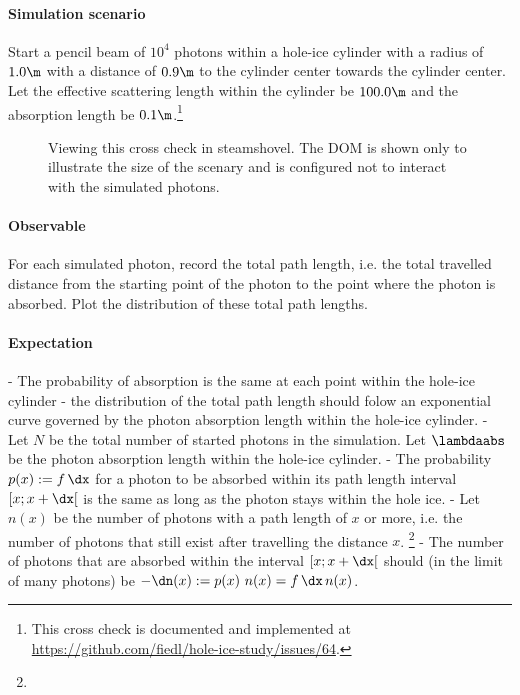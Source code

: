 \paragraph{Simulation scenario} Start a pencil beam of $10^4$ photons within a hole-ice cylinder with a radius of $1.0\m$ with a distance of $0.9\m$ to the cylinder center towards the cylinder center. Let the effective scattering length within the cylinder be $100.0\m$ and the absorption length be $0.1\m$.\footnote{This cross check is documented and implemented at \url{https://github.com/fiedl/hole-ice-study/issues/64}.}



\begin{figure}
  \caption{Viewing this cross check in steamshovel. The DOM is shown only to illustrate the size of the scenary and is configured not to interact with the simulated photons.}
\end{figure}

\paragraph{Observable} For each simulated photon, record the total path length, i.e. the total travelled distance from the starting point of the photon to the point where the photon is absorbed. Plot the distribution of these total path lengths.

\paragraph{Expectation}

- The probability of absorption is the same at each point within the hole-ice cylinder
- the distribution of the total path length should folow an exponential curve governed by the photon absorption length within the hole-ice cylinder.
- Let $N$ be the total number of started photons in the simulation. Let $\lambdaabs$ be the photon absorption length within the hole-ice cylinder.
- The probability $p(x):=f\,\dx$ for a photon to be absorbed within its path length interval $[x; x + \dx[$ is the same as long as the photon stays within the hole ice.
- Let $n(x)$ be the number of photons with a path length of $x$ or more, i.e. the number of photons that still exist after travelling the distance $x$. \footnote{}
- The number of photons that are absorbed within the interval $[x; x + \dx[$ should (in the limit of many photons) be $-\dn(x) := p(x)\ n(x) = f\,\dx\,n(x)$.

